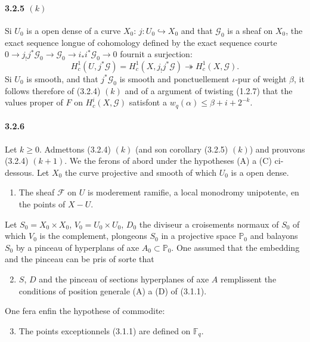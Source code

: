 \documentclass[12pt,a4paper]{article}
\theoremstyle{plain}
\theoremstyle{definition}
\theoremstyle{remark}
\newcommand{\FF}{{\mathbb{F}}}
\newcommand{\PP}{{\mathbb{P}}}
\begin{document}
\paragraph{3.2.5 $(k)$}
Si $U_0$ is a open dense of a curve $X_0$: $j : U_0 \hookrightarrow X_0$ and that $\mathscr{G}_0$ is a sheaf on $X_0$, the exact sequence longue of cohomology defined by the exact sequence courte $0 \to j_!j^*\mathscr{G}_0 \to \mathscr{G}_0 \to i_*i^*\mathscr{G}_0 \to 0$ fournit a surjection:
\[ H_c^1(U, j^*\mathscr{G}) = H_c^1(X, j_!j^*\mathscr{G}) \twoheadrightarrow H_c^1(X, \mathscr{G}). \]
Si $U_0$ is smooth, and that $j^*\mathscr{G}_0$ is smooth and ponctuellement $\iota$-pur of weight $\beta$, it follows therefore of (3.2.4) $(k)$ and of a argument of twisting (1.2.7) that the values proper of $F$ on $H_c^i(X, \mathscr{G})$ satisfont a $w_q(\alpha) \leq \beta + i + 2^{-k}$.


\paragraph{3.2.6}
Let $k \geq 0$. Admettons (3.2.4) $(k)$ (and son corollary (3.2.5) $(k)$) and prouvons (3.2.4) $(k+1)$. We the ferons of abord under the hypotheses (A) a (C) ci-dessous. Let $X_0$ the curve projective and smooth of which $U_0$ is a open dense.
\begin{enumerate}[label=(\Alph*)]
\item The sheaf $\mathscr{F}$ on $U$ is moderement ramifie, a local monodromy unipotente, en the points of $X - U$.
\end{enumerate}

Let $S_0 = X_0 \times X_0$, $V_0 = U_0 \times U_0$, $D_0$ the diviseur a croisements normaux of $S_0$ of which $V_0$ is the complement, plongeons $S_0$ in a projective space $\PP_0$ and balayons $S_0$ by a pinceau of hyperplans of axe $A_0 \subset \PP_0$. One assumed that the embedding and the pinceau can be pris of sorte that
\begin{enumerate}[label=(\Alph*)]
\setcounter{enumi}{1}
\item $S$, $D$ and the pinceau of sections hyperplanes of axe $A$ remplissent the conditions of position generale (A) a (D) of (3.1.1).
\end{enumerate}
One fera enfin the hypothese of commodite:
\begin{enumerate}[label=(\Alph*)]
\setcounter{enumi}{2}
\item The points exceptionnels (3.1.1) are defined on $\FF_q$.
\end{enumerate}
\end{document}
